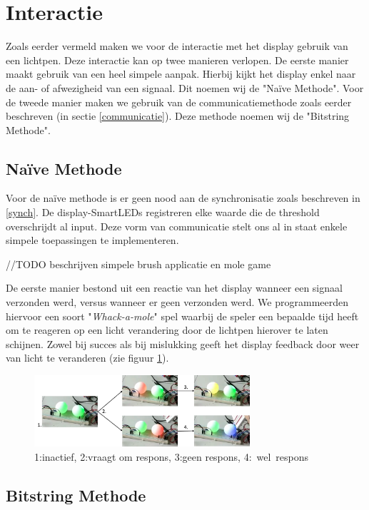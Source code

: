 \documentclass{article}
\begin{document}
\section{Interactie}
Zoals eerder vermeld maken we voor de interactie met het display gebruik van een lichtpen. Deze interactie kan op twee manieren verlopen. De eerste manier maakt gebruik van een heel simpele aanpak. Hierbij kijkt het display enkel naar de aan- of afwezigheid van een signaal. Dit noemen wij de "Na\"ive Methode". Voor de tweede manier maken we gebruik van de communicatiemethode zoals eerder beschreven (in sectie \ref{communicatie}). Deze methode noemen wij de "Bitstring Methode".

\subsection{Na\"ive Methode}

Voor de na\"ive methode is er geen nood aan de synchronisatie zoals beschreven in \ref{synch}. De display-SmartLEDs registreren elke waarde die de threshold overschrijdt al input. Deze vorm van communicatie stelt ons al in staat enkele simpele toepassingen te implementeren.

//TODO beschrijven simpele brush applicatie en mole game

De eerste manier bestond uit een reactie van het display wanneer een signaal verzonden werd, versus wanneer er geen verzonden werd. We programmeerden hiervoor een soort "\textit{Whack-a-mole}" spel waarbij de speler een bepaalde tijd heeft om te reageren op een licht verandering door de lichtpen hierover te laten schijnen. Zowel bij succes als bij mislukking geeft het display feedback door weer van licht te veranderen (zie figuur \ref{fig:mole}).

\begin{figure}[H]
\centering
\includegraphics[width=8cm]{moleSequence.png}
\caption{1:inactief, 2:vraagt om respons, 3:geen respons, \mbox{4: wel respons}}
\label{fig:mole}
\end{figure}

\subsection{Bitstring Methode}
\end{document}
